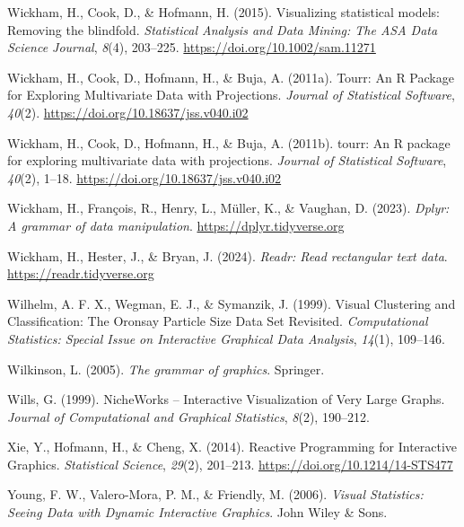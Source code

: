 \documentclass[
  letterpaper,
]{krantz}
\newlength{\cslhangindent}
\newenvironment{CSLReferences}[2] %
 {\begin{list}{}{%
  \setlength{\itemindent}{0pt}
  \setlength{\leftmargin}{0pt}
  \setlength{\parsep}{0pt}
  \ifodd #1
   \setlength{\leftmargin}{\cslhangindent}
   \setlength{\itemindent}{-1\cslhangindent}
  \fi
  \setlength{\itemsep}{#2\baselineskip}}}
 {\end{list}}
\begin{document}
\begin{CSLReferences}{1}{0}
Wickham, H., Cook, D., \& Hofmann, H. (2015). Visualizing statistical
models: Removing the blindfold. \emph{Statistical Analysis and Data
Mining: The ASA Data Science Journal}, \emph{8}(4), 203--225.
\url{https://doi.org/10.1002/sam.11271}

Wickham, H., Cook, D., Hofmann, H., \& Buja, A. (2011a). Tourr: {An} {R}
{Package} for {Exploring} {Multivariate} {Data} with {Projections}.
\emph{Journal of Statistical Software}, \emph{40}(2).
\url{https://doi.org/10.18637/jss.v040.i02}

Wickham, H., Cook, D., Hofmann, H., \& Buja, A. (2011b). {tourr}: An {R}
package for exploring multivariate data with projections. \emph{Journal
of Statistical Software}, \emph{40}(2), 1--18.
\url{https://doi.org/10.18637/jss.v040.i02}

Wickham, H., François, R., Henry, L., Müller, K., \& Vaughan, D. (2023).
\emph{Dplyr: A grammar of data manipulation}.
\url{https://dplyr.tidyverse.org}

Wickham, H., Hester, J., \& Bryan, J. (2024). \emph{Readr: Read
rectangular text data}. \url{https://readr.tidyverse.org}

Wilhelm, A. F. X., Wegman, E. J., \& Symanzik, J. (1999). Visual
{C}lustering and {C}lassification: {T}he {O}ronsay {P}article {S}ize
{D}ata {S}et {R}evisited. \emph{Computational Statistics: Special Issue
on Interactive Graphical Data Analysis}, \emph{14}(1), 109--146.

Wilkinson, L. (2005). \emph{The grammar of graphics}. Springer.

Wills, G. (1999). NicheWorks -- {I}nteractive {V}isualization of {V}ery
{L}arge {G}raphs. \emph{Journal of Computational and Graphical
Statistics}, \emph{8}(2), 190--212.

Xie, Y., Hofmann, H., \& Cheng, X. (2014). {Reactive Programming for
Interactive Graphics}. \emph{Statistical Science}, \emph{29}(2),
201--213. \url{https://doi.org/10.1214/14-STS477}

Young, F. W., Valero-Mora, P. M., \& Friendly, M. (2006). \emph{Visual
{S}tatistics: {S}eeing {D}ata with {D}ynamic {I}nteractive {G}raphics}.
John Wiley \& Sons.


\end{CSLReferences}
\end{document}
